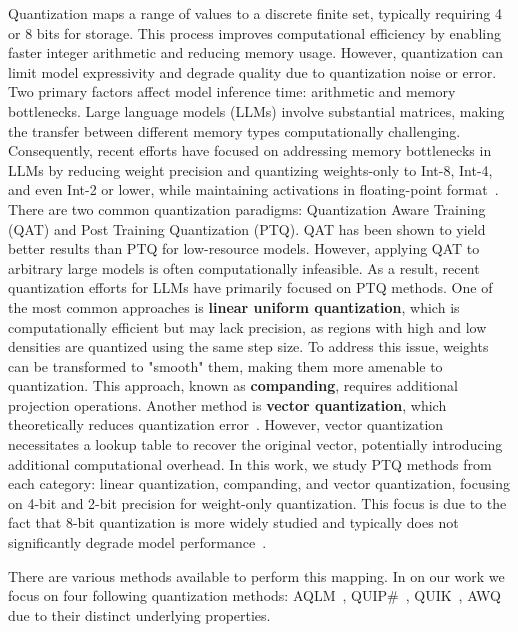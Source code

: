 Quantization maps a range of values to a discrete finite set, typically requiring 4 or 8 bits for storage. This process improves computational efficiency by enabling faster integer arithmetic and reducing memory usage. However, quantization can limit model expressivity and degrade quality due to quantization noise or error.
Two primary factors affect model inference time: arithmetic and memory bottlenecks. Large language models (LLMs) involve substantial matrices, making the transfer between different memory types computationally challenging. Consequently, recent efforts have focused on addressing memory bottlenecks in LLMs by reducing weight precision and quantizing weights-only to Int-8, Int-4, and even Int-2 or lower, while maintaining activations in floating-point format~\cite{egiazarian2024extreme, chee2024quip, ashkboos2023towards, lin2024awq}.
There are two common quantization paradigms: Quantization Aware Training (QAT) and Post Training Quantization (PTQ). QAT has been shown to yield better results than PTQ for low-resource models. However, applying QAT to arbitrary large models is often computationally infeasible. As a result, recent quantization efforts for LLMs have primarily focused on PTQ methods.
One of the most common approaches is \textbf{linear uniform quantization}, which is computationally efficient but may lack precision, as regions with high and low densities are quantized using the same step size. To address this issue, weights can be transformed to "smooth" them, making them more amenable to quantization. This approach, known as \textbf{companding}, requires additional projection operations. Another method is \textbf{vector quantization}, which theoretically reduces quantization error~\cite{gray1984vector, gray1998quantization}. However, vector quantization necessitates a lookup table to recover the original vector, potentially introducing additional computational overhead.
In this work, we study PTQ methods from each category: linear quantization, companding, and vector quantization, focusing on 4-bit and 2-bit precision for weight-only quantization. This focus is due to the fact that 8-bit quantization is more widely studied and typically does not significantly degrade model performance~\cite{li2024evaluating, liu2024evaluating, jin2024comprehensive}.


There are various methods available to perform this mapping. In on our work we focus on four following quantization methods: AQLM~\cite{egiazarian2024extreme}, QUIP\#~\cite{chee2024quip}, QUIK~\cite{ashkboos2023towards}, AWQ~\cite{lin2024awq} due to their distinct underlying properties.


